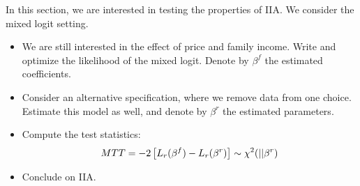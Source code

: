\documentclass[10pt,a4paper]{article}
\newcommand{\1}{\mathds{1}}
\begin{document}
\begin{Exercise}[title=IIA]
In this section, we are interested in testing the properties of IIA. We consider the mixed logit setting. 
\begin{itemize}
\item We are still interested in the effect of price and family income. Write and optimize the likelihood of the mixed logit. Denote by $\beta^f$ the estimated coefficients.
\item Consider an alternative specification, where we remove data from one choice. Estimate this model as well, and denote by $\beta^r$ the estimated parameters.
\item Compute the test statistics:
\begin{equation}
MTT = -2 \left[L_r(\beta^f) - L_r(\beta^r) \right] \sim \chi^2(||\beta^r\\)
\end{equation}
\item Conclude on IIA.
\end{itemize}
\end{Exercise}
\end{document}
